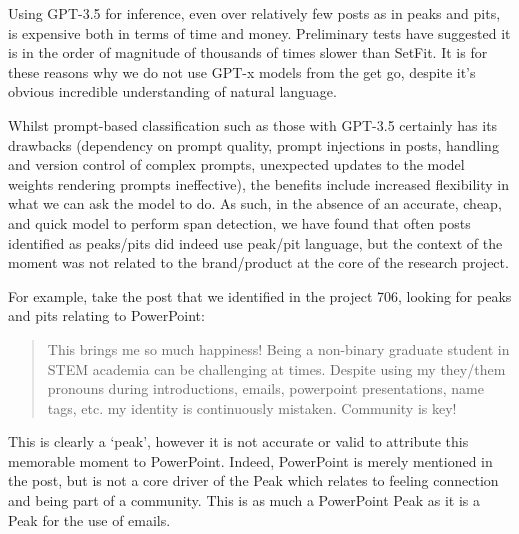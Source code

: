 \documentclass[
  letterpaper,
  DIV=11,
  numbers=noendperiod]{scrreprt}
\begin{document}
\begin{tcolorbox}[enhanced jigsaw, breakable, toprule=.15mm, titlerule=0mm, leftrule=.75mm, opacityback=0, opacitybacktitle=0.6, colbacktitle=quarto-callout-important-color!10!white, colback=white, bottomrule=.15mm, title=\textcolor{quarto-callout-important-color}{\faExclamation}\hspace{0.5em}{Why not use GPT from the start?}, coltitle=black, colframe=quarto-callout-important-color-frame, bottomtitle=1mm, toptitle=1mm, arc=.35mm, rightrule=.15mm, left=2mm]

Using GPT-3.5 for inference, even over relatively few posts as in peaks
and pits, is expensive both in terms of time and money. Preliminary
tests have suggested it is in the order of magnitude of thousands of
times slower than SetFit. It is for these reasons why we do not use
GPT-x models from the get go, despite it's obvious incredible
understanding of natural language.

\end{tcolorbox}

Whilst prompt-based classification such as those with GPT-3.5 certainly
has its drawbacks (dependency on prompt quality, prompt injections in
posts, handling and version control of complex prompts, unexpected
updates to the model weights rendering prompts ineffective), the
benefits include increased flexibility in what we can ask the model to
do. As such, in the absence of an accurate, cheap, and quick model to
perform span detection, we have found that often posts identified as
peaks/pits did indeed use peak/pit language, but the context of the
moment was not related to the brand/product at the core of the research
project.

For example, take the post that we identified in the project 706,
looking for peaks and pits relating to PowerPoint:

\begin{quote}
This brings me so much happiness! Being a non-binary graduate student in
STEM academia can be challenging at times. Despite using my they/them
pronouns during introductions, emails, powerpoint presentations, name
tags, etc. my identity is continuously mistaken. Community is key!
\end{quote}

This is clearly a `peak', however it is not accurate or valid to
attribute this memorable moment to PowerPoint. Indeed, PowerPoint is
merely mentioned in the post, but is not a core driver of the Peak which
relates to feeling connection and being part of a community. This is as
much a PowerPoint Peak as it is a Peak for the use of emails.
\end{document}
